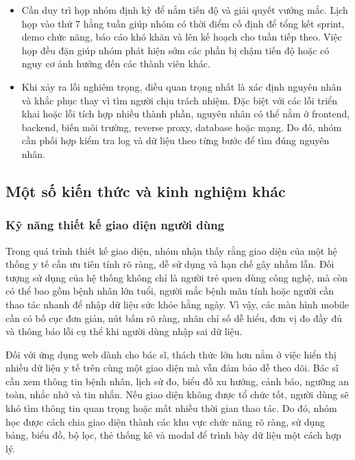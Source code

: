 \begin{itemize}
    \item Cần duy trì họp nhóm định kỳ để nắm tiến độ và giải quyết vướng mắc. Lịch họp vào thứ 7 hằng tuần giúp nhóm có thời điểm cố định để tổng kết sprint, demo chức năng, báo cáo khó khăn và lên kế hoạch cho tuần tiếp theo. Việc họp đều đặn giúp nhóm phát hiện sớm các phần bị chậm tiến độ hoặc có nguy cơ ảnh hưởng đến các thành viên khác.

    \item Khi xảy ra lỗi nghiêm trọng, điều quan trọng nhất là xác định nguyên nhân và khắc phục thay vì tìm người chịu trách nhiệm. Đặc biệt với các lỗi triển khai hoặc lỗi tích hợp nhiều thành phần, nguyên nhân có thể nằm ở frontend, backend, biến môi trường, reverse proxy, database hoặc mạng. Do đó, nhóm cần phối hợp kiểm tra log và dữ liệu theo từng bước để tìm đúng nguyên nhân.
\end{itemize}

\subsection{Một số kiến thức và kinh nghiệm khác}

\subsubsection{Kỹ năng thiết kế giao diện người dùng}
\par Trong quá trình thiết kế giao diện, nhóm nhận thấy rằng giao diện của một hệ thống y tế cần ưu tiên tính rõ ràng, dễ sử dụng và hạn chế gây nhầm lẫn. Đối tượng sử dụng của hệ thống không chỉ là người trẻ quen dùng công nghệ, mà còn có thể bao gồm bệnh nhân lớn tuổi, người mắc bệnh mãn tính hoặc người cần thao tác nhanh để nhập dữ liệu sức khỏe hằng ngày. Vì vậy, các màn hình mobile cần có bố cục đơn giản, nút bấm rõ ràng, nhãn chỉ số dễ hiểu, đơn vị đo đầy đủ và thông báo lỗi cụ thể khi người dùng nhập sai dữ liệu.

\par Đối với ứng dụng web dành cho bác sĩ, thách thức lớn hơn nằm ở việc hiển thị nhiều dữ liệu y tế trên cùng một giao diện mà vẫn đảm bảo dễ theo dõi. Bác sĩ cần xem thông tin bệnh nhân, lịch sử đo, biểu đồ xu hướng, cảnh báo, ngưỡng an toàn, nhắc nhở và tin nhắn. Nếu giao diện không được tổ chức tốt, người dùng sẽ khó tìm thông tin quan trọng hoặc mất nhiều thời gian thao tác. Do đó, nhóm học được cách chia giao diện thành các khu vực chức năng rõ ràng, sử dụng bảng, biểu đồ, bộ lọc, thẻ thống kê và modal để trình bày dữ liệu một cách hợp lý.

